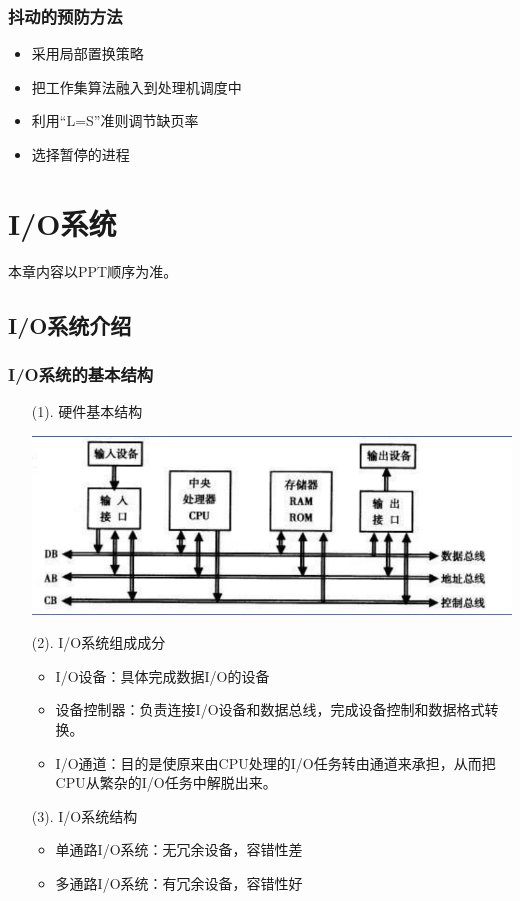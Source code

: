 \documentclass[12pt, a4paper, oneside]{ctexart}
\begin{document}
\subsubsection{抖动的预防方法}

\begin{itemize}
    \item 采用局部置换策略
    \item 把工作集算法融入到处理机调度中
    \item 利用“L=S”准则调节缺页率
    \item 选择暂停的进程
\end{itemize}

\newpage
\section{I/O系统}

本章内容以PPT顺序为准。

\subsection{I/O系统介绍}

\subsubsection{I/O系统的基本结构}

\begin{enumerate}
    \item [(1). ] 硬件基本结构
    
    \includegraphics[width=\textwidth]{./images/io_hardware.png}

    \item [(2). ] I/O系统组成成分
    \begin{itemize}
        \item I/O设备：具体完成数据I/O的设备
        \item 设备控制器：负责连接I/O设备和数据总线，完成设备控制和数据格式转换。
        \item I/O通道：目的是使原来由CPU处理的I/O任务转由通道来承担，从而把CPU从繁杂的I/O任务中解脱出来。
    \end{itemize}
    \item [(3). ] I/O系统结构
    \begin{itemize}
        \item 单通路I/O系统：无冗余设备，容错性差
        \item 多通路I/O系统：有冗余设备，容错性好
    \end{itemize}
\end{enumerate}
\end{document}
